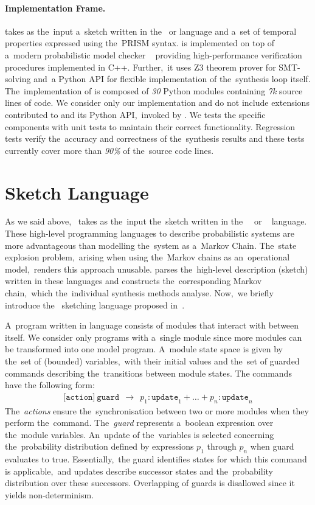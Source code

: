 \paragraph{Implementation Frame.}
\toolname{} takes as the~input a~sketch written in the~\jani{} or \prism{} language and a~set of temporal properties expressed using the~PRISM syntax. 
\toolname{} is implemented on top of a~modern probabilistic model checker \storm{}~\cite{STORM} providing  high-performance verification procedures implemented in C++.
Further,~it uses Z3 theorem prover for SMT-solving and~a Python API for flexible implementation of the~synthesis loop itself.
The~implementation of \toolname{} is composed of \textit{30} Python modules containing \textit{7k} source lines of code.
We consider only our implementation and do not include extensions contributed to \storm{} and its Python API,~invoked by \toolname{}.
We tests the specific components with unit tests to maintain their correct functionality.
Regression tests verify the~accuracy and correctness of the~synthesis results and these tests currently cover more than \textit{90\%} of the~source code lines.

\section{\prism{} Sketch Language} \label{sec:pris_language}
As we said above,~\toolname{} takes as the~input the~sketch written in the~\prism{}~\cite{KNP11} or \jani{}~\cite{jani} language.
These high-level programming languages to describe probabilistic systems are more advantageous than modelling the~system as a~Markov Chain.
The~state explosion problem,~arising when using the~Markov chains as an~operational model,~renders this approach unusable.
\storm{} parses the~high-level description (sketch) written in these languages and constructs the~corresponding Markov chain,~which the~individual synthesis methods analyse.
Now,~we briefly introduce the~\prism{} sketching language proposed in~\cite{cegis}.

A~program written in \prism{} language consists of modules that interact with between itself.
We consider only programs with a~single module since more modules can be transformed into one model program.
A~module state space is given by the~set of (bounded) variables,~with their initial values and the~set of guarded commands describing the~transitions between module states.
The commands have the following form:
\begin{align*}
\texttt{[action]} \
\texttt{guard}
\ \ \rightarrow \ \
p_1 : \texttt{update}_1 + \dots + p_n : \texttt{update}_n 
\end{align*}
The~\emph{actions} ensure the~synchronisation between two or more modules when they perform the~command.
The~\emph{guard} represents a~boolean expression over the~module variables.
An~update of the~variables is selected concerning the~probability distribution defined by expressions $p_1$ through $p_n$ when guard evaluates to true.
Essentially,~the guard identifies states for which this command is applicable,~and updates describe successor states and the~probability distribution over these successors.
Overlapping of guards is disallowed since it yields non-determinism.

